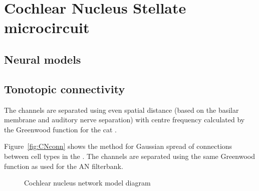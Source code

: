 




\section{Cochlear Nucleus Stellate microcircuit    \label{sec:CN:cochl-nucl-stell}}

\subsection{Neural models}




\subsection{Tonotopic connectivity    \label{sec:CN:tonot-conn}}

The channels are separated using even spatial distance (based on the
basilar membrane and auditory nerve separation) with centre frequency
calculated by the Greenwood function for the cat
\citep{Greenwood:1990}. 


Figure~\ref{fig:CNconn} shows the method for Gaussian spread of
connections between cell types in the \CN\@.  The channels are separated
using the same Greenwood function as used for the AN filterbank.

\begin{figure}[htb]
  \begin{center}
    \caption{Cochlear nucleus network model diagram \label{fig:CNdiagram}}
  \end{center}
\end{figure}



